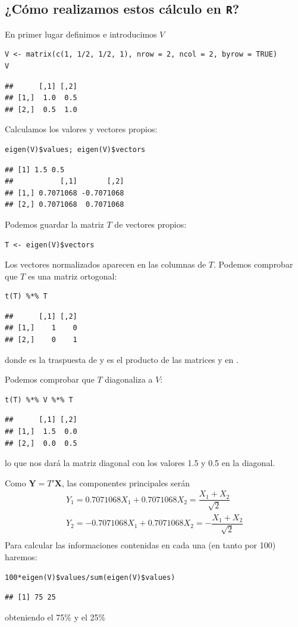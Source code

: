 \subsection{¿Cómo realizamos estos cálculo en \textbf{\texttt{R}}?}
En primer lugar definimos e introducimos $V$
\begin{lstlisting}
V <- matrix(c(1, 1/2, 1/2, 1), nrow = 2, ncol = 2, byrow = TRUE)
V
\end{lstlisting}
\begin{verbatim}
##      [,1] [,2]
## [1,]  1.0  0.5
## [2,]  0.5  1.0
\end{verbatim}
Calculamos los valores y vectores propios:
\begin{lstlisting}
eigen(V)$values; eigen(V)$vectors
\end{lstlisting}
\begin{verbatim}
## [1] 1.5 0.5
##           [,1]       [,2]
## [1,] 0.7071068 -0.7071068
## [2,] 0.7071068  0.7071068
\end{verbatim}
Podemos guardar la matriz $T$ de vectores propios:
\begin{lstlisting}[mathescape=false]
T <- eigen(V)$vectors
\end{lstlisting}
Los vectores normalizados aparecen en las columnas de $T$. Podemos comprobar que $T$ es una matriz ortogonal:
\begin{lstlisting}
t(T) %*% T
\end{lstlisting}
\begin{verbatim}
##      [,1] [,2]
## [1,]    1    0
## [2,]    0    1
\end{verbatim}
donde  es la traspuesta de  y  es el producto de las matrices  y  en .

Podemos comprobar que $T$ diagonaliza a $V$:
\begin{lstlisting}
t(T) %*% V %*% T
\end{lstlisting}
\begin{verbatim}
##      [,1] [,2]
## [1,]  1.5  0.0
## [2,]  0.0  0.5
\end{verbatim}
lo que nos dará la matriz diagonal con los valores 1.5 y 0.5 en la diagonal.

Como $\mathbf{Y}=T'\mathbf{X}$, las componentes principales serán \[ \begin{array}{l}
	Y_1=0.7071068X_1+0.7071068X_2=\dfrac{X_1+X_2}{\sqrt{2}}\\
	Y_2=-0.7071068X_1+0.7071068X_2=-\dfrac{X_1+X_2}{\sqrt{2}}\\
\end{array} \]
Para calcular las informaciones contenidas en cada una (en tanto por 100) haremos:
\begin{lstlisting}
100*eigen(V)$values/sum(eigen(V)$values)
\end{lstlisting}
\begin{verbatim}
## [1] 75 25
\end{verbatim}
obteniendo el 75\% y el 25\%
